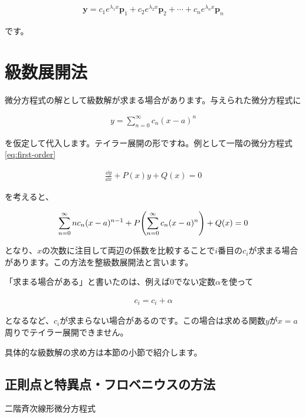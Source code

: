 \begin{eqnarray}
    \boldsymbol{y}=c_1e^{\lambda_1 x}\boldsymbol{p}_1+c_2e^{\lambda_2 x}\boldsymbol{p}_2+\cdots+c_ne^{\lambda_n x}\boldsymbol{p}_n
\end{eqnarray}

\noindent
です。






\section{級数展開法}
\label{expansion}
微分方程式の解として級数解が求まる場合があります。与えられた微分方程式に

\begin{eqnarray}
    y=\sum_{n=0}^\infty c_n(x-a)^n
\end{eqnarray}

\noindent
を仮定して代入します。テイラー展開の形ですね。例として一階の微分方程式\ref{eq:first-order}

\begin{eqnarray}
    \frac{\dd y}{\dd x}+P(x)y+Q(x)=0 \nonumber
\end{eqnarray}

\noindent
を考えると、

\begin{eqnarray}
    \sum_{n=0}^\infty nc_n(x-a)^{n-1}+P\pqty{\sum_{n=0}^\infty c_n(x-a)^n}+Q(x)=0
\end{eqnarray}

\noindent
となり、$x$の次数に注目して両辺の係数を比較することで$i$番目の$c_i$が求まる場合があります。この方法を整級数展開法と言います。

「求まる場合がある」と書いたのは、例えば0でない定数$\alpha$を使って

\begin{eqnarray}
c_i=c_i+\alpha
\end{eqnarray}

\noindent
となるなど、$c_i$が求まらない場合があるのです。この場合は求める関数$y$が$x=a$周りでテイラー展開できません。

具体的な級数解の求め方は本節の小節で紹介します。








\subsection{正則点と特異点・フロベニウスの方法}
\label{regular-singular}
二階斉次線形微分方程式

